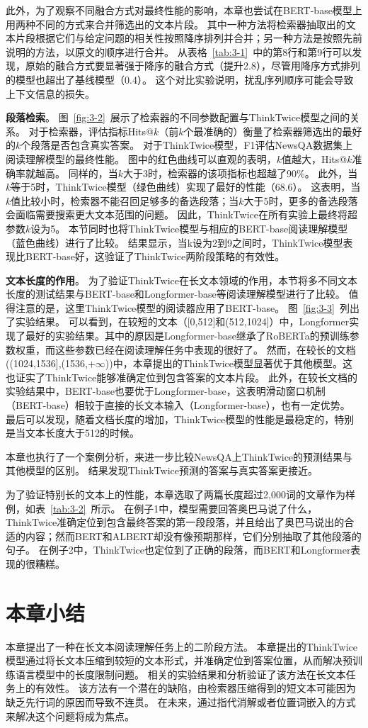 此外，为了观察不同融合方式对最终性能的影响，本章也尝试在BERT-base模型上用两种不同的方式来合并筛选出的文本片段。
其中一种方法将检索器抽取出的文本片段根据它们与给定问题的相关性按照降序排列并合并；另一种方法是按照先前说明的方法，以原文的顺序进行合并。
从表格~\ref{tab:3-1}~中的第8行和第9行可以发现，原始的融合方式要显著强于降序的融合方式（提升2.8），尽管用降序方式排列的模型也超出了基线模型（0.4）。
这个对比实验说明，扰乱序列顺序可能会导致上下文信息的损失。





\noindent \textbf{段落检索}。
图~\ref{fig:3-2}~展示了检索器的不同参数配置与ThinkTwice模型之间的关系。
对于检索器，评估指标Hits@$k$（前$k$个最准确的）衡量了检索器筛选出的最好的$k$个段落是否包含真实答案。
对于ThinkTwice模型，F1评估NewsQA数据集上阅读理解模型的最终性能。
图中的红色曲线可以直观的表明，$k$值越大，Hits@$k$准确率就越高。
同样的，当$k$大于3时，检索器的该项指标也超越了90\%。
此外，当$k$等于5时，ThinkTwice模型（绿色曲线）实现了最好的性能（68.6）。
这表明，当$k$值比较小时，检索器不能召回足够多的备选段落；当$k$大于5时，更多的备选段落会面临需要搜索更大文本范围的问题。
因此，ThinkTwice在所有实验上最终将超参数$k$设为5。
本节同时也将ThinkTwice模型与相应的BERT-base阅读理解模型（蓝色曲线）进行了比较。
结果显示，当k设为2到9之间时，ThinkTwice模型表现比BERT-base好，这验证了ThinkTwice两阶段策略的有效性。

\noindent \textbf{文本长度的作用}。
为了验证ThinkTwice在长文本领域的作用，本节将多不同文本长度的测试结果与BERT-base和Longformer-base等阅读理解模型进行了比较。
值得注意的是，这里ThinkTwice模型的阅读器应用了BERT-base。
图~\ref{fig:3-3}~列出了实验结果。
可以看到，在较短的文本（[0,512]和(512,1024]）中，Longformer实现了最好的实验结果。其中的原因是Longformer-base继承了RoBERTa的预训练参数权重，而这些参数已经在阅读理解任务中表现的很好了。
然而，在较长的文档((1024,1536],(1536,$+\infty$))中，本章提出的ThinkTwice模型显著优于其他模型。这也证实了ThinkTwice能够准确定位到包含答案的文本片段。
此外，在较长文档的实验结果中，BERT-base也要优于Longformer-base，这表明滑动窗口机制（BERT-base）相较于直接的长文本输入（Longformer-base），也有一定优势。
最后可以发现，随着文档长度的增加，ThinkTwice模型的性能是最稳定的，特别是当文本长度大于512的时候。


本章也执行了一个案例分析，来进一步比较NewsQA上ThinkTwice的预测结果与其他模型的区别。
结果发现ThinkTwice预测的答案与真实答案更接近。

为了验证特别长的文本上的性能，本章选取了两篇长度超过2,000词的文章作为样例，如表~\ref{tab:3-2}~所示。
在例子1中，模型需要回答奥巴马说了什么，ThinkTwice准确定位到包含最终答案的第一段段落，并且给出了奥巴马说出的合适的内容；然而BERT和ALBERT却没有像预期那样，它们分别抽取了其他段落的句子。
在例子2中，ThinkTwice也定位到了正确的段落，而BERT和Longformer表现的很糟糕。


\section{本章小结}
本章提出了一种在长文本阅读理解任务上的二阶段方法。
本章提出的ThinkTwice模型通过将长文本压缩到较短的文本形式，并准确定位到答案位置，从而解决预训练语言模型中的长度限制问题。
相关的实验结果和分析验证了该方法在长文本任务上的有效性。
该方法有一个潜在的缺陷，由检索器压缩得到的短文本可能因为缺乏先行词的原因而导致不连贯。
在未来，通过指代消解或者位置词嵌入的方式来解决这个问题将成为焦点。


